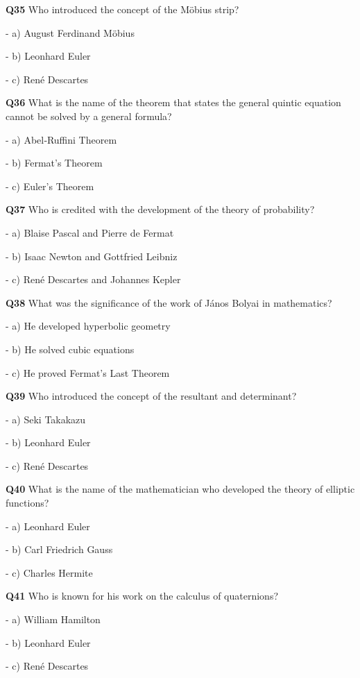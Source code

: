 \textbf{Q35} Who introduced the concept of the Möbius strip?\par
\quad - a) August Ferdinand Möbius\par
\quad - b) Leonhard Euler\par
\quad - c) René Descartes\par

\textbf{Q36} What is the name of the theorem that states the general quintic equation cannot be solved by a general formula?\par
\quad - a) Abel‑Ruffini Theorem\par
\quad - b) Fermat's Theorem\par
\quad - c) Euler's Theorem\par

\textbf{Q37} Who is credited with the development of the theory of probability?\par
\quad - a) Blaise Pascal and Pierre de Fermat\par
\quad - b) Isaac Newton and Gottfried Leibniz\par
\quad - c) René Descartes and Johannes Kepler\par

\textbf{Q38} What was the significance of the work of János Bolyai in mathematics?\par
\quad - a) He developed hyperbolic geometry\par
\quad - b) He solved cubic equations\par
\quad - c) He proved Fermat's Last Theorem\par

\textbf{Q39} Who introduced the concept of the resultant and determinant?\par
\quad - a) Seki Takakazu\par
\quad - b) Leonhard Euler\par
\quad - c) René Descartes\par

\textbf{Q40} What is the name of the mathematician who developed the theory of elliptic functions?\par
\quad - a) Leonhard Euler\par
\quad - b) Carl Friedrich Gauss\par
\quad - c) Charles Hermite\par

\textbf{Q41} Who is known for his work on the calculus of quaternions?\par
\quad - a) William Hamilton\par
\quad - b) Leonhard Euler\par
\quad - c) René Descartes\par

